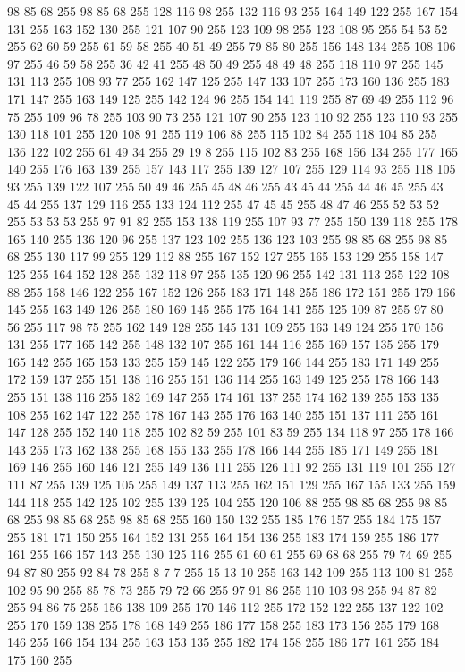 98 85 68 255 98 85 68 255 128 116 98 255 132 116 93 255 164 149 122 255 167 154 131 255 163 152 130 255 121 107 90 255 123 109 98 255 123 108 95 255 54 53 52 255 62 60 59 255 61 59 58 255 40 51 49 255 79 85 80 255 156 148 134 255 108 106 97 255 46 59 58 255 36 42 41 255 48 50 49 255 48 49 48 255 118 110 97 255 145 131 113 255 108 93 77 255 162 147 125 255 147 133 107 255 173 160 136 255 183 171 147 255 163 149 125 255 142 124 96 255 154 141 119 255 87 69 49 255 112 96 75 255 109 96 78 255 103 90 73 255 121 107 90 255 123 110 92 255 123 110 93 255 130 118 101 255 120 108 91 255 119 106 88 255 115 102 84 255 118 104 85 255 136 122 102 255 61 49 34 255 29 19 8 255 115 102 83 255 168 156 134 255 177 165 140 255 176 163 139 255 157 143 117 255 139 127 107 255 129 114 93 255 118 105 93 255 139 122 107 255 50 49 46 255 45 48 46 255 43 45 44 255 44 46 45 255 43 45 44 255 137 129 116 255 133 124 112 255 47 45 45 255 48 47 46 255
52 53 52 255 53 53 53 255 97 91 82 255 153 138 119 255 107 93 77 255 150 139 118 255 178 165 140 255 136 120 96 255 137 123 102 255 136 123 103 255 98 85 68 255 98 85 68 255 130 117 99 255 129 112 88 255 167 152 127 255 165 153 129 255 158 147 125 255 164 152 128 255 132 118 97 255 135 120 96 255 142 131 113 255 122 108 88 255 158 146 122 255 167 152 126 255 183 171 148 255 186 172 151 255 179 166 145 255 163 149 126 255 180 169 145 255 175 164 141 255 125 109 87 255 97 80 56 255 117 98 75 255 162 149 128 255 145 131 109 255 163 149 124 255 170 156 131 255 177 165 142 255 148 132 107 255 161 144 116 255 169 157 135 255 179 165 142 255 165 153 133 255 159 145 122 255 179 166 144 255 183 171 149 255 172 159 137 255 151 138 116 255 151 136 114 255 163 149 125 255 178 166 143 255 151 138 116 255 182 169 147 255 174 161 137 255 174 162 139 255 153 135 108 255 162 147 122 255 178 167 143 255 176 163 140 255 151 137 111 255 161 147 128 255 152 140 118 255 102 82 59 255 101 83 59 255
134 118 97 255 178 166 143 255 173 162 138 255 168 155 133 255 178 166 144 255 185 171 149 255 181 169 146 255 160 146 121 255 149 136 111 255 126 111 92 255 131 119 101 255 127 111 87 255 139 125 105 255 149 137 113 255 162 151 129 255 167 155 133 255 159 144 118 255 142 125 102 255 139 125 104 255 120 106 88 255 98 85 68 255 98 85 68 255 98 85 68 255 98 85 68 255 160 150 132 255 185 176 157 255 184 175 157 255 181 171 150 255 164 152 131 255 164 154 136 255 183 174 159 255 186 177 161 255 166 157 143 255 130 125 116 255 61 60 61 255 69 68 68 255 79 74 69 255 94 87 80 255 92 84 78 255 8 7 7 255 15 13 10 255 163 142 109 255 113 100 81 255 102 95 90 255 85 78 73 255 79 72 66 255 97 91 86 255 110 103 98 255 94 87 82 255 94 86 75 255 156 138 109 255 170 146 112 255 172 152 122 255 137 122 102 255 170 159 138 255 178 168 149 255 186 177 158 255 183 173 156 255 179 168 146 255 166 154 134 255 163 153 135 255 182 174 158 255 186 177 161 255 184 175 160 255
